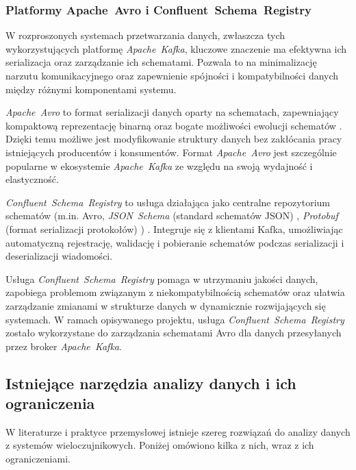 \subsubsection{Platformy \mbox{Apache Avro} i \mbox{Confluent Schema Registry}}
\label{subsubsec:avro_schema_registry}

W rozproszonych systemach przetwarzania danych, zwłaszcza tych wykorzystujących platformę \mbox{\textit{Apache Kafka}}, kluczowe znaczenie ma efektywna ich serializacja oraz zarządzanie ich schematami. Pozwala to na minimalizację narzutu komunikacyjnego oraz zapewnienie spójności i kompatybilności danych między różnymi komponentami systemu.

\textit{\mbox{\textit{Apache Avro}}} to format serializacji danych oparty na schematach, zapewniający kompaktową reprezentację binarną oraz bogate możliwości ewolucji schematów \cite{avro_documentation}. Dzięki temu możliwe jest modyfikowanie struktury danych bez zakłócania pracy istniejących producentów i konsumentów. Format \mbox{\textit{Apache Avro}} jest szczególnie popularne w ekosystemie \mbox{\textit{Apache Kafka}} ze względu na swoją wydajność i elastyczność.

\textit{\mbox{\textit{Confluent Schema Registry}}} to usługa działająca jako centralne repozytorium schematów (m.in. Avro, \mbox{\textit{JSON Schema}} (standard schematów JSON) \cite{json_schema_spec}, \mbox{\textit{Protobuf}} (format serializacji protokołów) \cite{protobuf_docs}) \cite{confluent_schema_registry}. Integruje się z klientami Kafka, umożliwiając automatyczną rejestrację, walidację i pobieranie schematów podczas serializacji i deserializacji wiadomości. 

Usługa \mbox{\textit{Confluent Schema Registry}} pomaga w utrzymaniu jakości danych, zapobiega problemom związanym z niekompatybilnością schematów oraz ułatwia zarządzanie zmianami w strukturze danych w dynamicznie rozwijających się systemach. W ramach opisywanego projektu, usługa \mbox{\textit{Confluent Schema Registry}} zostało wykorzystane do zarządzania schematami Avro dla danych przesyłanych przez broker \mbox{\textit{Apache Kafka}}.

\subsection{Istniejące narzędzia analizy danych i ich ograniczenia}
\label{subsec:istniejace_rozwiazania}

W literaturze i praktyce przemysłowej istnieje szereg rozwiązań do analizy danych z systemów wieloczujnikowych. Poniżej omówiono kilka z nich, wraz z ich ograniczeniami.

